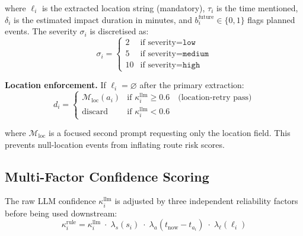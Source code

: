 where $\ell_i$ is the extracted location string (mandatory),
$\tau_i$ is the time mentioned, $\delta_i$ is the estimated impact
duration in minutes, and $b_i^{\text{future}} \in \{0,1\}$ flags
planned events. The severity $\sigma_i$ is discretised as:
\begin{equation}
  \sigma_i =
  \begin{cases}
    2  & \text{if severity} = \texttt{low} \\
    5  & \text{if severity} = \texttt{medium} \\
    10 & \text{if severity} = \texttt{high}
  \end{cases}
  \label{eq:severity_map}
\end{equation}

\textbf{Location enforcement.} If $\ell_i = \varnothing$ after the
primary extraction:
\begin{equation}
  d_i =
  \begin{cases}
    \mathcal{M}_{\text{loc}}(a_i) & \text{if } \kappa_i^{\text{llm}} \geq 0.6
      \quad \text{(location-retry pass)} \\
    \text{discard}                & \text{if } \kappa_i^{\text{llm}} < 0.6
  \end{cases}
  \label{eq:location_enforcement}
\end{equation}

where $\mathcal{M}_{\text{loc}}$ is a focused second prompt requesting
only the location field. This prevents null-location events from
inflating route risk scores.

\subsection{Multi-Factor Confidence Scoring}

The raw LLM confidence $\kappa_i^{\text{llm}}$ is adjusted by three
independent reliability factors before being used downstream:
\begin{equation}
  \kappa_i^{\text{rule}} =
  \kappa_i^{\text{llm}}
  \;\cdot\; \lambda_s(s_i)
  \;\cdot\; \lambda_a(t_{\text{now}} - t_{a_i})
  \;\cdot\; \lambda_\ell(\ell_i)
  \label{eq:rule_confidence}
\end{equation}

